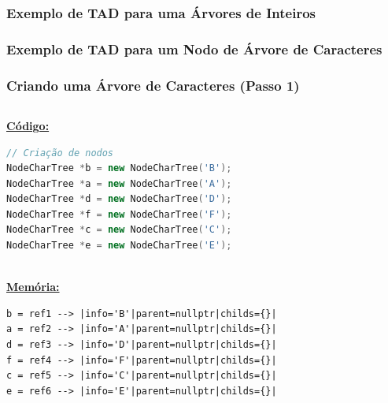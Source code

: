 \documentclass[aspectratio=169]{beamer}
\begin{document}
\begin{frame}\frametitle{Exemplo de TAD para uma Árvores de Inteiros}
\fontsize{3pt}{5pt}\selectfont{

}
\end{frame}

\begin{frame}[fragile]\frametitle{Exemplo de TAD para um Nodo de Árvore de Caracteres}
\fontsize{3pt}{5pt}\selectfont{

}
\end{frame}

\begin{frame}[fragile]\frametitle{Criando uma Árvore de Caracteres (Passo 1)}
\begin{columns}[T]
\begin{column}{0.5\linewidth}
\textbf{\underline{Código:}}
\begin{lstlisting}[language=C++,basicstyle=\ttfamily\tiny]
// Criação de nodos
NodeCharTree *b = new NodeCharTree('B');
NodeCharTree *a = new NodeCharTree('A');
NodeCharTree *d = new NodeCharTree('D');
NodeCharTree *f = new NodeCharTree('F');
NodeCharTree *c = new NodeCharTree('C');
NodeCharTree *e = new NodeCharTree('E');
\end{lstlisting}
~\\
\textbf{\underline{Memória:}}
{\tiny
\begin{verbatim}
b = ref1 --> |info='B'|parent=nullptr|childs={}|
a = ref2 --> |info='A'|parent=nullptr|childs={}|
d = ref3 --> |info='D'|parent=nullptr|childs={}|
f = ref4 --> |info='F'|parent=nullptr|childs={}|
c = ref5 --> |info='C'|parent=nullptr|childs={}|
e = ref6 --> |info='E'|parent=nullptr|childs={}|
\end{verbatim}
}
\end{column}
\begin{column}{0.5\linewidth}
\begin{figure}[h]
	\centering

\end{figure}
\end{column}
\end{columns}
\end{frame}
\end{document}
